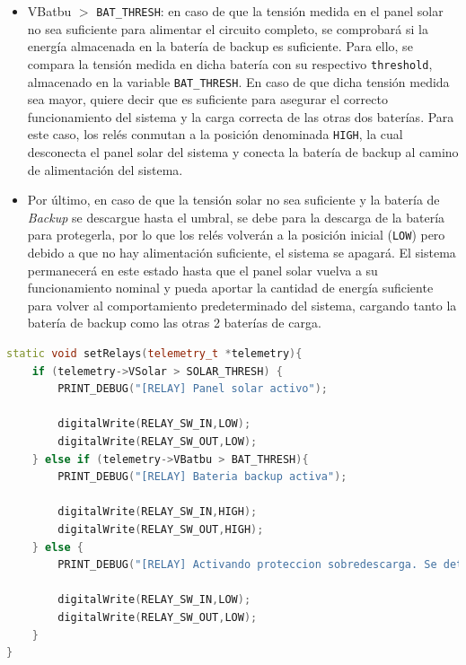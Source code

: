 \begin{itemize}
\begin{itemize}
        \item VBatbu $>$ \texttt{BAT\_THRESH}: en caso de que la tensión medida en el panel solar no sea suficiente para alimentar el circuito completo, se comprobará si la energía almacenada en la batería de backup es suficiente. Para ello, se compara la tensión medida en dicha batería con su respectivo \texttt{threshold}, almacenado en la variable \texttt{BAT\_THRESH}. En caso de que dicha tensión medida sea mayor, quiere decir que es suficiente para asegurar el correcto funcionamiento del sistema y la carga correcta de las otras dos baterías. Para este caso, los relés conmutan a la posición denominada \texttt{HIGH}, la cual desconecta el panel solar del sistema y conecta la batería de backup al camino de alimentación del sistema.
        \item Por último, en caso de que la tensión solar no sea suficiente y la batería de \textit{Backup} se descargue hasta el umbral, se debe para la descarga de la batería para protegerla, por lo que los relés volverán a la posición inicial (\texttt{LOW}) pero debido a que no hay alimentación suficiente, el sistema se apagará. El sistema permanecerá en este estado hasta que el panel solar vuelva a su funcionamiento nominal y pueda aportar la cantidad de energía suficiente para volver al comportamiento predeterminado del sistema, cargando tanto la batería de backup como las otras 2 baterías de carga. 
    \end{itemize}
    \begin{lstlisting}[captionpos=b, caption={Desarrollo función \texttt{setRelays}}, language=c++]
static void setRelays(telemetry_t *telemetry){
    if (telemetry->VSolar > SOLAR_THRESH) {
        PRINT_DEBUG("[RELAY] Panel solar activo");

        digitalWrite(RELAY_SW_IN,LOW);
        digitalWrite(RELAY_SW_OUT,LOW);
    } else if (telemetry->VBatbu > BAT_THRESH){
        PRINT_DEBUG("[RELAY] Bateria backup activa");

        digitalWrite(RELAY_SW_IN,HIGH);
        digitalWrite(RELAY_SW_OUT,HIGH);
    } else {
        PRINT_DEBUG("[RELAY] Activando proteccion sobredescarga. Se detendra el sistema");

        digitalWrite(RELAY_SW_IN,LOW);
        digitalWrite(RELAY_SW_OUT,LOW);
    }
}
    \end{lstlisting}
\end{itemize}
